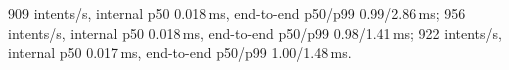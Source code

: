 909 intents/s, internal p50 0.018\,ms, end-to-end p50/p99 0.99/2.86\,ms; 956 intents/s, internal p50 0.018\,ms, end-to-end p50/p99 0.98/1.41\,ms; 922 intents/s, internal p50 0.017\,ms, end-to-end p50/p99 1.00/1.48\,ms.